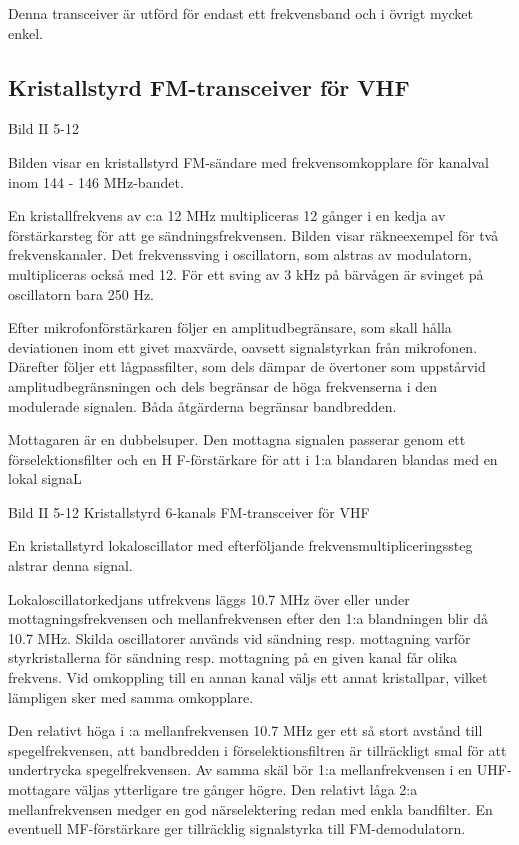 Denna transceiver är utförd för endast ett frekvensband och i övrigt
mycket enkel.

\subsection{Kristallstyrd FM-transceiver för VHF}

Bild II 5-12

Bilden visar en kristallstyrd FM-sändare med frekvensomkopplare för
kanalval inom 144 - 146 MHz-bandet.

En kristallfrekvens av c:a 12 MHz multipliceras 12 gånger i en kedja
av förstärkarsteg för att ge sändningsfrekvensen. Bilden visar
räkneexempel för två frekvenskanaler. Det frekvenssving i oscillatorn,
som alstras av modulatorn, multipliceras också med 12.  För ett sving
av 3 kHz på bärvågen är svinget på oscillatorn bara 250 Hz.

Efter mikrofonförstärkaren följer en amplitudbegränsare, som skall
hålla deviationen inom ett givet maxvärde, oavsett signalstyrkan från
mikrofonen. Därefter följer ett lågpassfilter, som dels dämpar de
övertoner som uppstårvid amplitudbegränsningen och dels begränsar de
höga frekvenserna i den modulerade signalen. Båda åtgärderna begränsar
bandbredden.

Mottagaren är en dubbelsuper. Den mottagna signalen passerar genom ett
förselektionsfilter och en H F-förstärkare för att i 1:a blandaren
blandas med en lokal signaL

Bild II 5-12 Kristallstyrd 6-kanals FM-transceiver för VHF



En kristallstyrd lokaloscillator med efterföljande
frekvensmultipliceringssteg alstrar denna signal.

Lokaloscillatorkedjans utfrekvens läggs 10.7 MHz över eller under
mottagningsfrekvensen och mellanfrekvensen efter den 1:a blandningen
blir då 10.7 MHz. Skilda oscillatorer används vid sändning
resp. mottagning varför styrkristallerna för sändning resp.
mottagning på en given kanal får olika frekvens. Vid omkoppling till
en annan kanal väljs ett annat kristallpar, vilket lämpligen sker med
samma omkopplare.

Den relativt höga i :a mellanfrekvensen 10.7 MHz ger ett så stort
avstånd till spegelfrekvensen, att bandbredden i förselektionsfiltren
är tillräckligt smal för att undertrycka spegelfrekvensen. Av samma
skäl bör 1:a mellanfrekvensen i en UHF-mottagare väljas ytterligare
tre gånger högre. Den relativt låga 2:a mellanfrekvensen medger en god
närselektering redan med enkla bandfilter.  En eventuell
MF-förstärkare ger tillräcklig signalstyrka till FM-demodulatorn.


